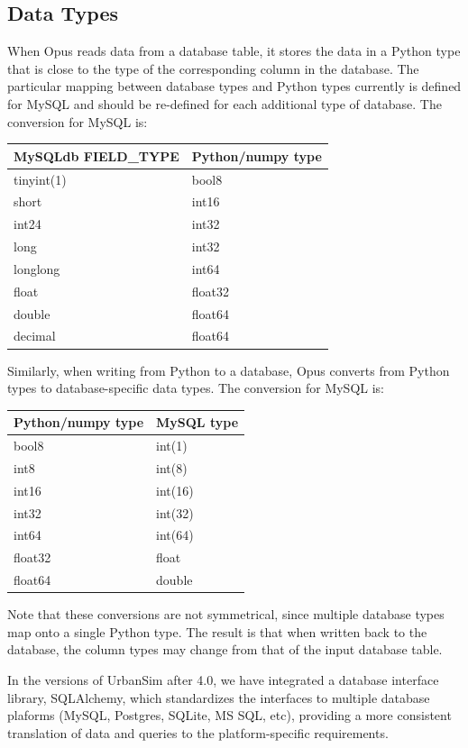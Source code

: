 \subsection{Data Types}

   When Opus reads data from a database table, it stores the
data in a Python type that is close to the type of the corresponding
column in the database.  The particular mapping between database
types and Python types currently is defined for MySQL \mysqlindex
and should be re-defined for each additional type of database.  The
conversion for MySQL is:

\begin{tabular}{ll}
MySQLdb FIELD_TYPE & Python/numpy type \\
\hline
tinyint(1) & bool8 \\
short & int16 \\
int24 & int32 \\
long & int32 \\
longlong & int64 \\
float & float32 \\
double & float64 \\
decimal & float64 \\
\end{tabular}

Similarly, when writing from Python to a database, Opus converts from Python
types to database-specific data types.  The conversion for MySQL is:

\begin{tabular}{ll}
Python/numpy type & MySQL type \\
\hline
bool8 & int(1) \\
int8 & int(8) \\
int16 & int(16) \\
int32 & int(32) \\
int64 & int(64) \\
float32 & float \\
float64 & double \\
\end{tabular}

Note that these conversions are not symmetrical, since multiple
database types map onto a single Python type.  The result is that
when written back to the database, the column types may change from
that of the input database table.

In the versions of UrbanSim after 4.0, we have integrated a database
interface library, SQLAlchemy, which standardizes the interfaces to
multiple database plaforms (MySQL, Postgres, SQLite, MS SQL, etc),
providing a more consistent translation of data and queries to the
platform-specific requirements. 

